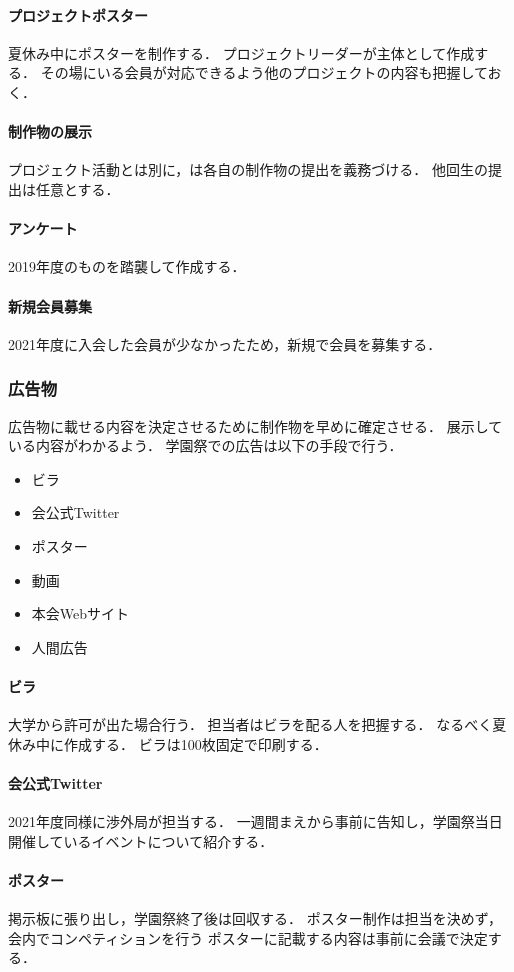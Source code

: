 \paragraph{プロジェクトポスター}
夏休み中にポスターを制作する．
プロジェクトリーダーが主体として作成する．
その場にいる会員が対応できるよう他のプロジェクトの内容も把握しておく．
\paragraph{制作物の展示}
プロジェクト活動とは別に\secondGrade{}，\thirdGrade{}は各自の制作物の提出を義務づける．
他回生の提出は任意とする．
\paragraph{アンケート}
2019年度のものを踏襲して作成する．
\paragraph{新規会員募集}
2021年度に入会した会員が少なかったため，新規で会員を募集する．
    
\subsubsection*{広告物}
広告物に載せる内容を決定させるために制作物を早めに確定させる．
展示している内容がわかるよう．
学園祭での広告は以下の手段で行う．
\begin{itemize}
    \item ビラ
    \item 会公式Twitter
    \item ポスター
    \item 動画
    \item 本会Webサイト
    \item 人間広告
\end{itemize}
\paragraph{ビラ}
大学から許可が出た場合行う．
担当者はビラを配る人を把握する．
なるべく夏休み中に作成する．
ビラは100枚固定で印刷する．
\paragraph{会公式Twitter}
2021年度同様に渉外局が担当する．
一週間まえから事前に告知し，学園祭当日開催しているイベントについて紹介する．
\paragraph{ポスター}
掲示板に張り出し，学園祭終了後は回収する．
ポスター制作は担当を決めず，会内でコンペティションを行う
ポスターに記載する内容は事前に会議で決定する．
